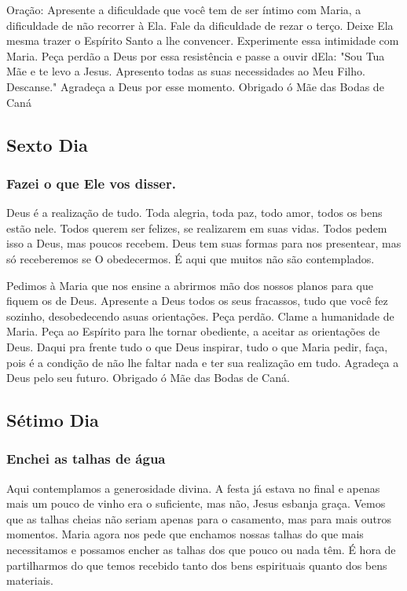 \documentclass[11pt]{article}
\begin{document}
Oração: Apresente a dificuldade que você tem de ser íntimo com Maria, a dificuldade de não recorrer à Ela. Fale da dificuldade de rezar o terço.  Deixe Ela mesma trazer o Espírito Santo a lhe convencer. Experimente essa intimidade com Maria. Peça perdão a Deus por essa resistência e passe a ouvir dEla: "Sou Tua Mãe e te levo a Jesus. Apresento todas as suas necessidades ao Meu Filho.  Descanse." Agradeça a Deus por esse momento. Obrigado ó Mãe das Bodas de Caná

\subsection{Sexto Dia}
\subsubsection*{Fazei o que Ele vos disser.}
Deus é a realização de tudo. Toda alegria, toda paz, todo amor, todos os bens estão nele. Todos querem ser felizes, se realizarem em suas vidas. Todos pedem isso a Deus, mas poucos recebem. Deus tem suas formas para nos presentear, mas só receberemos se O obedecermos. É aqui que muitos não são contemplados.

Pedimos à Maria que nos ensine a abrirmos mão dos nossos planos para que fiquem os de Deus. Apresente a Deus todos os seus fracassos, tudo que você fez sozinho, desobedecendo asuas orientações. Peça perdão. Clame a humanidade de Maria. Peça ao Espírito para lhe tornar obediente, a aceitar as orientações de Deus.  Daqui pra frente tudo o que Deus inspirar, tudo o que Maria pedir, faça, pois é a condição de não lhe faltar nada e ter sua realização em tudo. Agradeça a Deus pelo seu futuro. Obrigado ó Mãe das Bodas de Caná.

\subsection{Sétimo Dia}
\subsubsection*{Enchei as talhas de água}
Aqui contemplamos a generosidade divina. A festa já estava no final e apenas mais um pouco de vinho era o suficiente, mas não, Jesus esbanja graça. Vemos que as talhas cheias não seriam apenas para o casamento, mas para mais outros momentos. Maria agora nos pede que enchamos nossas talhas do que mais necessitamos e possamos encher as talhas dos que pouco ou nada têm. É hora de partilharmos do que temos recebido tanto dos bens espirituais quanto dos bens materiais.
\end{document}
